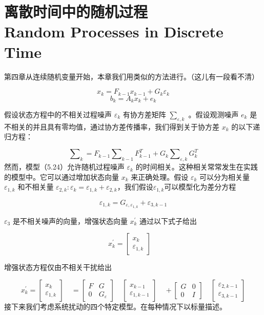 \section[离散时间中的随机过程]{离散时间中的随机过程\\Random Processes in Discrete Time}
	第四章从连续随机变量开始，本章我们用类似的方法进行。（这儿有一段看不清）
	
		\[ x_{k}=F_{k-1}x_{k-1}+G_{k}\varepsilon_{k} \]
		\begin{equation}\label{5.24}
	b_{k}=A_{k}x_{k}+e_{k}
	\end{equation}
	
	
	假设状态方程中的不相关过程噪声 $ \varepsilon_{k} $ 有协方差矩阵 $\sum_{\varepsilon,k} $ 。假设观测噪声  $ e_{k} $ 是不相关的并且具有零均值，通过协方差传播率，我们得到关于协方差 $ x_{k} $ 的以下递归方程：
	
	\begin{equation}\label{5.25}
	\sum\nolimits_{k}=F_{k-1}\sum\nolimits_{k-1}F_{k-1}^{T}+G_{k}\sum\nolimits_{\varepsilon,k}G_{k}^{T}
	\end{equation}
		然而，模型（5.24）允许随机过程噪声 $ \varepsilon_{k} $ 的时间相关。这种相关常常发生在实践的模型中。它可以通过增加状态向量 $ x_{k} $  来正确处理。假设 $ \varepsilon_{k} $ 可以分为相关量 $ \varepsilon_{1,k} $ 和不相关量 $ \varepsilon_{2,k}: \varepsilon_{k} = \varepsilon_{1,k} + \varepsilon_{2,k} $，我们假设$\varepsilon_{1,k} $可以模型化为差分方程
		
			\[ \varepsilon_{1,k}=G_{\varepsilon,\varepsilon_{1,k}}+\varepsilon_{3,k-1} \]
			
		 $ \varepsilon_{3} $	是不相关噪声的向量，增强状态向量 $ x_{k}^{'} $ 通过以下式子给出
		 
		 \[ x_{k}^{'}=\begin{bmatrix} x_{k}  \\ \varepsilon_{1,k}\end{bmatrix} \quad \]
		 
		 增强状态方程仅由不相关干扰给出
		 
		 	\begin{equation}\label{5.26}
		 x_{k}^{'}=\begin{bmatrix} x_{k}  \\ \varepsilon_{1,k}\end{bmatrix} \quad=\begin{bmatrix} F&G  \\ 0&G_{\varepsilon}\end{bmatrix} \quad \begin{bmatrix} x_{k-1}  \\ \varepsilon_{1,k-1}\end{bmatrix} \quad
		 + \begin{bmatrix} G&0 \\ 0&I\end{bmatrix} \quad \begin{bmatrix} \varepsilon_{2,k-1}  \\ \varepsilon_{3,k-1}\end{bmatrix} 
		 \end{equation}
		 接下来我们考虑系统扰动的四个特定模型。在每种情况下以标量描述。
		 
